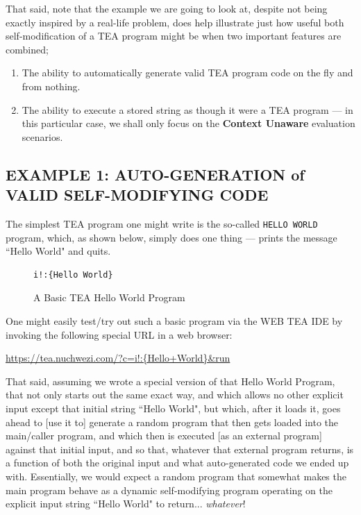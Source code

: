 \documentclass[a4paper, 18pt]{book} %
\begin{document}
That said, note that the example we are going to look at, despite not being exactly inspired by a real-life problem, does help illustrate just how useful both self-modification of a TEA program might be when two important features are combined; 

\begin{enumerate}
\item The ability to automatically generate valid TEA program code on the fly and from nothing.
\item The ability to execute a stored string as though it were a TEA program --- in this particular case, we shall only focus on the \textbf{Context Unaware} evaluation scenarios.
\end{enumerate}


\subsection{EXAMPLE 1: AUTO-GENERATION of VALID SELF-MODIFYING CODE}
\label{SECEXAMP1E}


The simplest TEA program one might write is the so-called \texttt{HELLO WORLD} program, which, as shown below, simply does one thing --- prints the message ``Hello World" and quits.


\begin{figure}[H]
 \Large
  \begin{tcolorbox}[teaterminalstyle, title=A Basic TEA Hello World Program]
  \begin{lstlisting}[language=TEA]
i!:{Hello World}
   \end{lstlisting}
  \end{tcolorbox}
  \caption{A Basic TEA Hello World Program}
  \label{EXTEAHW}
\end{figure}


One might easily test/try out such a basic program via the WEB TEA IDE by invoking the following special URL in a web browser:

\vspace{1em}

 \url{https://tea.nuchwezi.com/?c=i!:{Hello+World}&run}

\vspace{1em}
That said, assuming we wrote a special version of that Hello World Program, that not only starts out the same exact way, and which allows no other explicit input except that initial string ``Hello World", but which, after it loads it, goes ahead to [use it to] generate a random program that then gets loaded into the main/caller program, and which then is executed [as an external program] against that initial input, and so that, whatever that external program returns, is a function of both the original input and what auto-generated code we ended up with. Essentially, we would expect a random program that somewhat makes the main program behave as a dynamic self-modifying program operating on the explicit input string ``Hello World" to return... \textit{whatever}!
\end{document}
